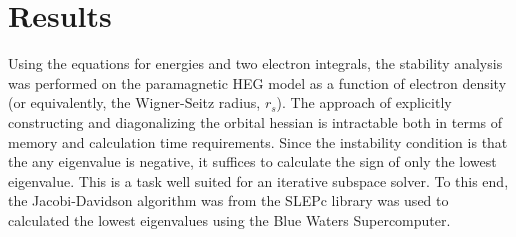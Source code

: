 \documentclass[preprint, journal=prl]{revtex4-1}
\begin{document}
\section{Results}   
  Using the equations for energies and two electron integrals, the stability analysis was performed on the paramagnetic HEG model as a function of electron density (or equivalently, the Wigner-Seitz radius, $r_s$). The approach of explicitly constructing and diagonalizing the orbital hessian is intractable both in terms of memory and calculation time requirements. Since the instability condition is that the any eigenvalue is negative, it suffices to calculate the sign of only the lowest eigenvalue. This is a task well suited for an iterative subspace solver. To this end, the Jacobi-Davidson algorithm was from the SLEPc library was used to calculated the lowest eigenvalues using the Blue Waters Supercomputer\cite{Hernandez2005}. 
  
\end{document}
